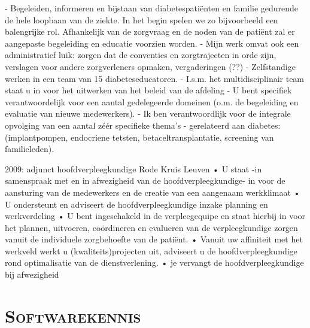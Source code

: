 \documentclass[10pt,a4paper]{moderncv}
\begin{document}
-	Begeleiden, informeren en bijstaan van diabetespatiënten en familie gedurende de hele loopbaan van de ziekte. In het begin spelen we zo bijvoorbeeld een balengrijke rol. Afhankelijk van de zorgvraag en de noden van de patiënt zal er aangepaste begeleiding en educatie voorzien worden.
-	Mijn werk omvat ook een administratief luik: zorgen dat de conventies en zorgtrajecten in orde zijn, verslagen voor andere zorgverleners opmaken, vergaderingen (??)   
-	Zelfstandige werken in een team van 15 diabeteseducatoren. 
-	I.s.m. het multidisciplinair team staat u in voor het uitwerken van het beleid van de afdeling
-	U bent specifiek verantwoordelijk voor een aantal gedelegeerde domeinen (o.m. de begeleiding en evaluatie van nieuwe medewerkers).
-	Ik ben verantwoordlijk voor de integrale opvolging van een aantal zéér specifieke thema’s -  gerelateerd aan diabetes: (implantpompen, endocriene tetsten, betaceltransplantatie, screening van familieleden).  

2009: adjunct hoofdverpleegkundige Rode Kruis Leuven
•	U staat -in samenspraak met en in afwezigheid van de hoofdverpleegkundige- in voor de aansturing van de medewerkers en de creatie van een aangenaam werkklimaat
•	U ondersteunt en adviseert de hoofdverpleegkundige inzake planning en werkverdeling
•	U bent ingeschakeld in de verpleegequipe en staat hierbij in voor het plannen, uitvoeren, coördineren en evalueren van de verpleegkundige zorgen vanuit de individuele zorgbehoefte van de patiënt. 
•	Vanuit uw affiniteit met het werkveld werkt u (kwaliteits)projecten uit, adviseert u de hoofdverpleegkundige rond optimalisatie van de dienstverlening. 
•	je vervangt de hoofdverpleegkundige bij afwezigheid






\closesection{}

\section{\textsc{Softwarekennis}}
\cvitem{}{}
\closesection{}
\end{document}
